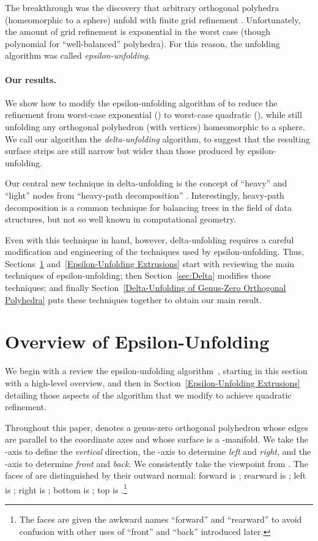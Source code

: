 \documentclass[11pt]{article}
\begin{document}
The breakthrough was the discovery that arbitrary orthogonal polyhedra
(homeomorphic to a sphere) unfold with finite grid refinement
\cite{Damian-Flatland-O'Rourke-2007-epsilon}.
Unfortunately, the amount of grid refinement is exponential
in the worst case (though polynomial for ``well-balanced'' polyhedra).
For this reason, the unfolding algorithm was called
\emph{epsilon-unfolding}.

\paragraph{Our results.}
We show how to modify the epsilon-unfolding algorithm of
\cite{Damian-Flatland-O'Rourke-2007-epsilon}
to reduce the refinement from worst-case exponential ()
to worst-case quadratic (), while still unfolding
any orthogonal polyhedron (with  vertices) homeomorphic to a sphere.
We call our algorithm the \emph{delta-unfolding} algorithm,
to suggest that the resulting surface strips are still narrow
but wider than those produced by epsilon-unfolding.

Our central new technique in delta-unfolding is the concept of ``heavy''
and ``light'' nodes from ``heavy-path decomposition''
\cite{Sleator-Tarjan-1983}.  Interestingly, heavy-path decomposition
is a common technique for balancing trees in the field of data structures,
but not so well known in computational geometry.

Even with this technique in hand, however, delta-unfolding requires a
careful modification and engineering of the techniques used by
epsilon-unfolding.  Thus, Sections~\ref{sec:overview}
and~\ref{Epsilon-Unfolding Extrusions} start with reviewing the
main techniques of epsilon-unfolding; then Section~\ref{sec:Delta}
modifies those techniques; and finally
Section~\ref{Delta-Unfolding of Genus-Zero Orthogonal Polyhedra}
puts these techniques together to obtain our main result.


\section{Overview of Epsilon-Unfolding}
\label{sec:overview}

We begin with a review the epsilon-unfolding algorithm~\cite{Damian-Flatland-O'Rourke-2007-epsilon},
starting in this section with a high-level overview,
and then in Section~\ref{Epsilon-Unfolding Extrusions}
detailing those aspects of the algorithm
that we modify to achieve quadratic refinement.


Throughout this paper,
 denotes a genus-zero orthogonal polyhedron whose edges are parallel to the
coordinate axes and whose surface is a -manifold.
We take the -axis to define the \emph{vertical} direction,
the -axis to determine \emph{left} and \emph{right},
and the -axis to determine \emph{front} and \emph{back}.
We consistently take the viewpoint from .
The faces of  are distinguished by their outward normal:
forward is ; rearward is ; left is ; right is ; bottom is ;
top is .\footnote{The  faces are given the awkward names
  ``forward'' and ``rearward'' to avoid confusion with other uses
  of ``front'' and ``back'' introduced later.}
\end{document}

